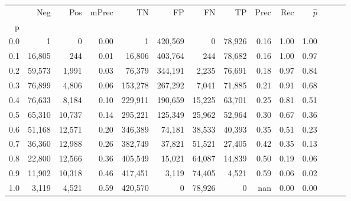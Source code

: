 \begin{tabular}{rrrrrrrrrrrrrr}
\toprule
{} &     Neg &     Pos & mPrec &       TN &       FP &      FN &      TP &  Prec &   Rec & $\hat{p}$ \\
p   &         &         &       &          &          &         &         &       &       &           \\
\midrule
0.0 &       1 &       0 &  0.00 &        1 &  420,569 &       0 &  78,926 &  0.16 &  1.00 &      1.00 \\
0.1 &  16,805 &     244 &  0.01 &   16,806 &  403,764 &     244 &  78,682 &  0.16 &  1.00 &      0.97 \\
0.2 &  59,573 &   1,991 &  0.03 &   76,379 &  344,191 &   2,235 &  76,691 &  0.18 &  0.97 &      0.84 \\
0.3 &  76,899 &   4,806 &  0.06 &  153,278 &  267,292 &   7,041 &  71,885 &  0.21 &  0.91 &      0.68 \\
0.4 &  76,633 &   8,184 &  0.10 &  229,911 &  190,659 &  15,225 &  63,701 &  0.25 &  0.81 &      0.51 \\
0.5 &  65,310 &  10,737 &  0.14 &  295,221 &  125,349 &  25,962 &  52,964 &  0.30 &  0.67 &      0.36 \\
0.6 &  51,168 &  12,571 &  0.20 &  346,389 &   74,181 &  38,533 &  40,393 &  0.35 &  0.51 &      0.23 \\
0.7 &  36,360 &  12,988 &  0.26 &  382,749 &   37,821 &  51,521 &  27,405 &  0.42 &  0.35 &      0.13 \\
0.8 &  22,800 &  12,566 &  0.36 &  405,549 &   15,021 &  64,087 &  14,839 &  0.50 &  0.19 &      0.06 \\
0.9 &  11,902 &  10,318 &  0.46 &  417,451 &    3,119 &  74,405 &   4,521 &  0.59 &  0.06 &      0.02 \\
1.0 &   3,119 &   4,521 &  0.59 &  420,570 &        0 &  78,926 &       0 &   nan &  0.00 &      0.00 \\
\bottomrule
\end{tabular}
